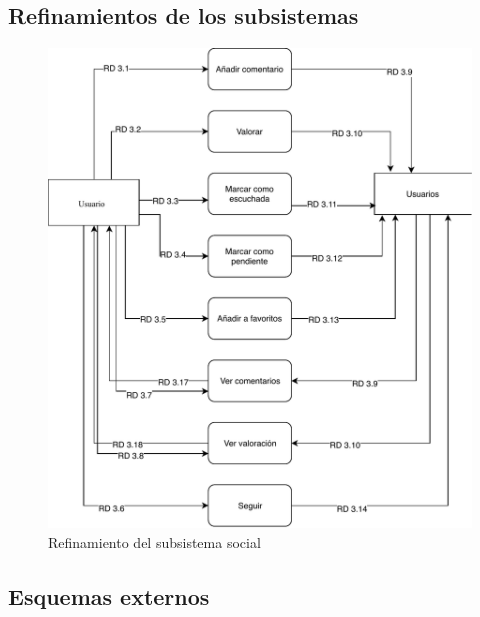 \subsection{Refinamientos de los subsistemas}

\begin{figure}[H]
  \caption{Refinamiento del subsistema social}
  \centering
  \includegraphics{diagramas/ref-social.pdf}
\end{figure}

\subsection{Esquemas externos}

